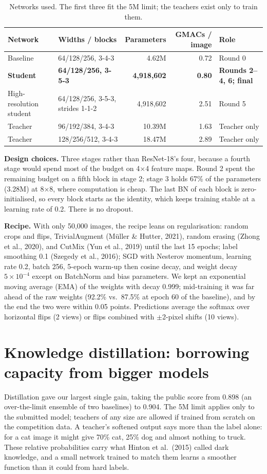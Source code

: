 \documentclass[11pt]{article}
\begin{document}
\begin{table}[h]
\centering\small
\caption{Networks used. The first three fit the 5M limit; the teachers exist only to train them.}
\label{tab:nets}
\begin{tabularx}{\linewidth}{@{}llrrX@{}}
\toprule
Network & Widths / blocks & Parameters & GMACs / image & Role \\
\midrule
Baseline & 64/128/256, 3-4-3 & 4.62M & 0.72 & Round 0 \\
\textbf{Student} & \textbf{64/128/256, 3-5-3} & \textbf{4,918,602} & \textbf{0.80} & \textbf{Rounds 2--4, 6; final} \\
High-resolution student & 64/128/256, 3-5-3, strides 1-1-2 & 4,918,602 & 2.51 & Round 5 \\
Teacher & 96/192/384, 3-4-3 & 10.39M & 1.63 & Teacher only \\
Teacher & 128/256/512, 3-4-3 & 18.47M & 2.89 & Teacher only \\
\bottomrule
\end{tabularx}
\end{table}

\textbf{Design choices.} Three stages rather than ResNet-18's four, because a fourth stage would spend most of the budget on 4$\times$4 feature maps. Round 2 spent the remaining budget on a fifth block in stage 2; stage 3 holds 67\% of the parameters (3.28M) at 8$\times$8, where computation is cheap. The last BN of each block is zero-initialised, so every block starts as the identity, which keeps training stable at a learning rate of 0.2. There is no dropout.

\textbf{Recipe.} With only 50,000 images, the recipe leans on regularisation: random crops and flips, TrivialAugment (M\"uller \& Hutter, 2021), random erasing (Zhong et al., 2020), and CutMix (Yun et al., 2019) until the last 15 epochs; label smoothing 0.1 (Szegedy et al., 2016); SGD with Nesterov momentum, learning rate 0.2, batch 256, 5-epoch warm-up then cosine decay, and weight decay $5\times10^{-4}$ except on BatchNorm and bias parameters. We kept an exponential moving average (EMA) of the weights with decay 0.999; mid-training it was far ahead of the raw weights (92.2\% vs.\ 87.5\% at epoch 60 of the baseline), and by the end the two were within 0.05 points. Predictions average the softmax over horizontal flips (2 views) or flips combined with $\pm$2-pixel shifts (10 views).

\section{Knowledge distillation: borrowing capacity from bigger models}
Distillation gave our largest single gain, taking the public score from 0.898 (an over-the-limit ensemble of two baselines) to 0.904. The 5M limit applies only to the submitted model; teachers of any size are allowed if trained from scratch on the competition data. A teacher's softened output says more than the label alone: for a cat image it might give 70\% cat, 25\% dog and almost nothing to truck. These relative probabilities carry what Hinton et al.\ (2015) called dark knowledge, and a small network trained to match them learns a smoother function than it could from hard labels.
\end{document}
